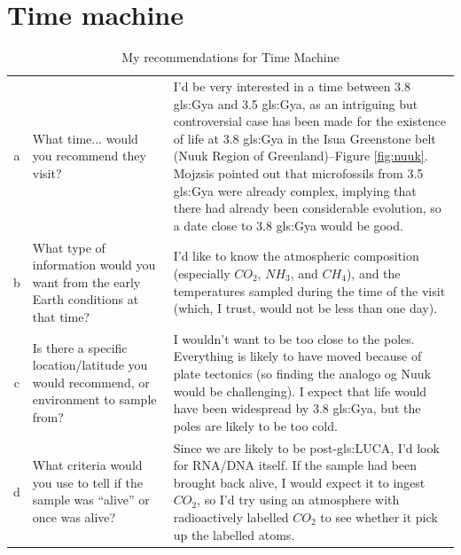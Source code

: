 \documentclass[]{article}
\begin{document}
\section{Time machine}

\begin{table}[H]
	\caption{My recommendations for Time Machine}
	{
	\begin{tabular}{|c|p{3cm}|p{8cm}| } \hline
		a&What time... would you recommend they visit? &I'd be very interested in a time between 3.8 \gls{gls:Gya} and 3.5 \gls{gls:Gya}, as an intriguing but controversial case has been made for the existence of life \cite{mojzsis1996evidence,nutman2016rapid} at 3.8 \gls{gls:Gya} in the Isua Greenstone belt (Nuuk Region of Greenland)\cite{enwiki:1095301862}--Figure \ref{fig:nuuk}. Mojzsis\cite{mojzsis1996evidence} pointed out that microfossils from 3.5 \gls{gls:Gya} were already complex, implying that there had already been considerable evolution, so a date close to 3.8 \gls{gls:Gya} would be good.\\
		b& What type of information would you want from the early Earth conditions at that time?& I'd like to know the atmospheric composition (especially $CO_2$, $NH_3$, and $CH_4$), and the temperatures sampled during the time of the visit (which, I trust, would not be less than one day).\\
		c& Is there a specific location/latitude you would recommend, or environment to sample		from? &I wouldn't want to be too close to the poles. Everything is likely to have moved because of plate tectonics (so finding the analogo og Nuuk would be challenging). I expect that life would have been widespread by 3.8 \gls{gls:Gya}, but the poles are likely to be too cold.\\
		d& What criteria would you use to tell if the sample was “alive” or once was alive? &Since we are likely to be post-\gls{gls:LUCA}, I'd look for RNA/DNA itself. If the sample had been brought back alive, I would expect it to ingest $CO_2$, so I'd try using an atmosphere with radioactively labelled $CO_2$ to see whether it pick up the labelled atoms.\\\hline
	\end{tabular}}
\end{table}
\end{document}
